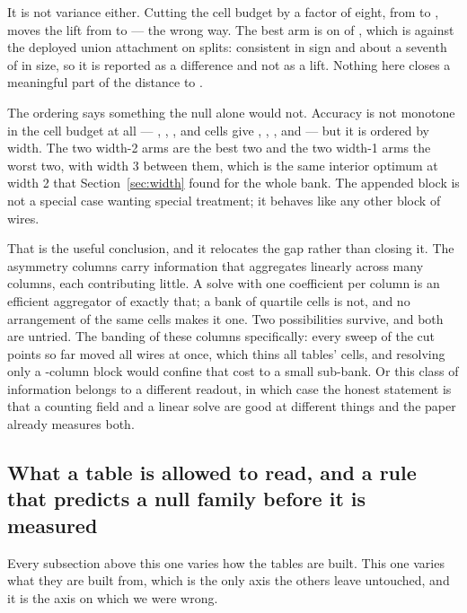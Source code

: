 \documentclass[11pt]{article}
\begin{document}
It is not variance either. Cutting the cell budget by a factor of eight, from
\BlkWTwoSixteenCells{} to \BlkWOneFourCells{}, moves the lift from
\BlkWTwoSixteen{} to \BlkWOneFour{} --- the wrong way. The best arm is
\BlkWTwoFour{} on \BlkWTwoFourSplits{} of \LadderSplits{}, which is
\BlkWTwoFourVsUnion{} against the deployed union attachment on
\BlkWTwoFourVsUnionSplits{} splits: consistent in sign and about a seventh of
\SatReseed{} in size, so it is reported as a difference and not as a lift. Nothing
here closes a meaningful part of the distance to \BlkFisher{}.

The ordering says something the null alone would not. Accuracy is not monotone in
the cell budget at all --- \BlkWTwoSixteenCells{}, \BlkWOneSixteenCells{},
\BlkWOneFourCells{}, \BlkWTwoFourCells{} and \BlkWThreeSixteenCells{} cells give
\BlkWTwoSixteen{}, \BlkWOneSixteen{}, \BlkWOneFour{}, \BlkWTwoFour{} and
\BlkWThreeSixteen{} --- but it is ordered by width. The two width-2 arms are the
best two and the two width-1 arms the worst two, with width 3 between them, which is
the same interior optimum at width 2 that Section~\ref{sec:width} found for the
whole bank. The appended block is not a special case wanting special treatment; it
behaves like any other block of wires.

That is the useful conclusion, and it relocates the gap rather than closing it. The
asymmetry columns carry information that aggregates linearly across many columns,
each contributing little. A solve with one coefficient per column is an efficient
aggregator of exactly that; a bank of quartile cells is not, and no arrangement of
the same cells makes it one. Two possibilities survive, and both are untried. The
banding of these columns specifically: every sweep of the cut points so far moved
all \NTabWires{} wires at once, which thins all \CompTablesFull{} tables' cells, and
resolving only a \BlkNewColumns{}-column block would confine that cost to a small
sub-bank. Or this class of information belongs to a different readout, in which case
the honest statement is that a counting field and a linear solve are good at
different things and the paper already measures both.

\subsection{What a table is allowed to read, and a rule that predicts a null
family before it is measured}
\label{sec:families}
Every subsection above this one varies how the tables are built. This one varies
what they are built from, which is the only axis the others leave untouched, and
it is the axis on which we were wrong.
\end{document}
